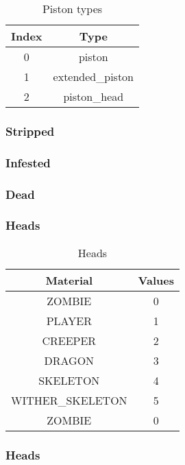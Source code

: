 \begin{table}[H]
\centering
\begin{tabular}{ |c|c| }
	\hline
	Index & Type \\
	\hline
	0 & piston \\
	1 & extended\_piston \\
	2 & piston\_head \\
	\hline
\end{tabular}
\caption{Piston types}
\end{table}

\subsubsection{Stripped}\label{spigot-types:stripped}

\subsubsection{Infested}\label{spigot-types:infested}

\subsubsection{Dead}\label{spigot-types:dead}

\subsubsection{Heads}

\begin{table}[H]
	\centering
	\begin{tabular}{ |c|c| }
		\hline
		Material & Values \\
		\hline
		ZOMBIE & 0 \\
		PLAYER & 1 \\
		CREEPER & 2 \\
		DRAGON & 3 \\
		SKELETON & 4 \\
		WITHER\_SKELETON & 5 \\
		ZOMBIE & 0 \\
		\hline
	\end{tabular}
	\caption{Heads}
\end{table}

\subsubsection{Heads}

